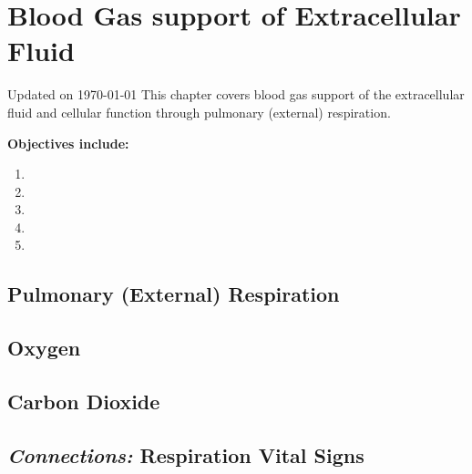 \chapter{Blood Gas support of Extracellular Fluid}\label{chp:blood_oxygen}
Updated on \today
\minitoc
This chapter covers blood gas support of the extracellular fluid and cellular function through pulmonary (external) respiration.

\vspace{5mm}

\textbf{Objectives include:}
\begin{enumerate}
    \item
    \item
    \item
    \item
    \item
\end{enumerate}

\section{Pulmonary (External) Respiration}

\section{Oxygen}

\section{Carbon Dioxide}

\section{\textit{Connections:} Respiration Vital Signs}

\printbibliography[heading=subbibintoc]